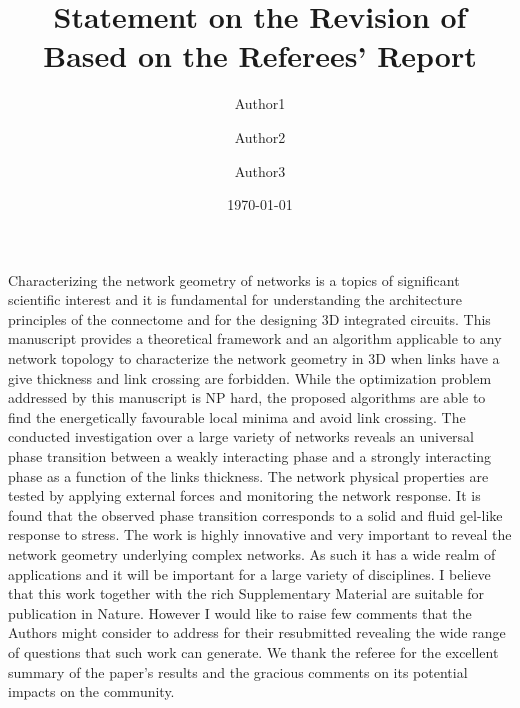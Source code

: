 \documentclass[11pt]{article}
\title{Statement on the Revision of \meta{Paper ID} \\
  Based on the Referees' Report}
\author{Author1 \and Author2 \and Author3}
\date{\today}
\newcommand{\outNim}[1]{}
\newcommand\meta[1]{$\langle\hbox{#1}\rangle$}
\newcommand\PaperTitle[1]{``\textit{#1}''}
\begin{document}
\outNim{
\subsection*{TODO}

 \linespread{1}

\begin{enumerate}
    \item Code online
    \item Why using $d\log\be{R}/d\log r_N$? 
    Advantage over $dV/dr$?
    \item Wouldn't it be a first order transition if slope of $V $ shows discontinuity?
\end{enumerate}
}%
 \linespread{1.5}

\begin{response}{
Characterizing the network geometry of networks is a topics of significant scientific interest and it is fundamental for understanding the architecture principles of the connectome and for the designing 3D integrated circuits. This manuscript provides a theoretical framework and an algorithm applicable to any network topology to characterize the network geometry in 3D when links have a give thickness and link crossing are forbidden.
While the optimization problem addressed by this manuscript is NP hard, the proposed algorithms are able to find the energetically favourable local minima and avoid link crossing. The conducted investigation over a large variety of networks reveals an universal phase transition between a weakly interacting phase and a strongly interacting phase as a function of the links thickness. The network physical properties are tested by applying external forces and monitoring the network response. It is found that the observed phase transition corresponds to a solid and fluid gel-like response to stress.
The work is highly innovative and very important to reveal the network geometry underlying complex networks. As such it has a wide realm of applications and it will be important for a large variety of disciplines. I believe that this work together with the rich Supplementary Material are suitable for publication in Nature.
However I would like to raise few comments that the Authors might consider to address for their resubmitted revealing the wide range of questions that such work can generate.
}
We thank the referee for the excellent summary of the paper's results and the gracious comments on its potential impacts on the community. 

\end{response}
\end{document}
